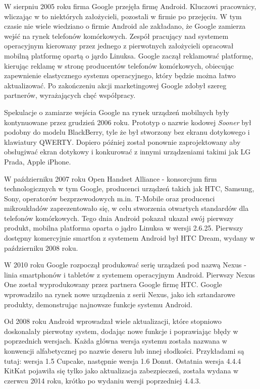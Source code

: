 W sierpniu 2005 roku firma Google przejęła firmę Android. Kluczowi pracownicy, wliczając w to niektórych założycieli, pozostali w firmie po przejęciu.\cite{android:9} W tym czasie nie wiele wiedziano o firmie Android ale zakładano, że Google zamierza wejść na rynek telefonów komórkowych.\cite{android:9} Zespół pracujący nad systemem operacyjnym kierowany przez jednego z pierwotnych założycieli opracował mobilną platformę opartą o jąrdo Linuksa. Google zaczął reklamować platformę, kierując reklamę w stronę producentów telefonów komórkowych, obiecując zapewnienie elastycznego systemu operacyjnego, który będzie można łatwo aktualizować. Po zakończeniu akcji marketingowej Google zdobył szereg partnerów, wyrażających chęć współpracy.\cite{android:11}\cite{android:12}\cite{android:13}

Spekulacje o zamiarze wejścia Google na rynek urządzeń mobilnych były kontynuowane przez grudzień 2006 roku.\cite{android:14} Prototyp o nazwie kodowej \emph{Sooner} był podobny do modelu BlackBerry, tyle że był stworzony bez ekranu dotykowego i klawiatury QWERTY. Dopiero później został ponownie zaprojektowany aby obsługiwać ekran dotykowy i konkurować z innymi urządzeniami takimi jak LG Prada, Apple iPhone.\cite{android:15}\cite{android:16}

W październiku 2007 roku Open Handset Alliance - konsorcjum firm technologicznych w tym Google, producenci urządzeń takich jak HTC, Samsung, Sony, operatorów bezprzewodowych m.in. T-Mobile oraz producenci mikroukładów zaprezentowało się, w celu stworzenia otwartych standardów dla telefonów komórkowych.\cite{android:17} Tego dnia Android pokazał ukazał swój pierwszy produkt, mobilna platforma oparta o jądro Linuksa w wersji 2.6.25.\cite{android:17}\cite{android:18} Pierwszy dostępny komercyjnie smartfon z systemem Android był HTC Dream, wydany w październiku 2008 roku.\cite{android:19}

W 2010 roku Google rozpoczął produkować serię urządzeń pod nazwą Nexus - linia smartphonów i tabletów z systemem operacyjnym Android. Pierwszy Nexus One został wyprodukowany przez partnera Google firmę HTC.\cite{android:20} Google wprowadziło na rynek nowe urządzenia z serii Nexus, jako ich sztandarowe produkty, demonstrując najnowsze funkcje systemu Android.

Od 2008 roku Android wprowadzał wiele aktualizacji, które stopniowo doskonalały pierwotny system, dodając nowe funkcje i poprawiając błędy w poprzednich wersjach. Każda główna wersja systemu została nazwana w konwencji alfabetycznej po nazwie deseru lub innej słodkości. Przykładami są tutaj: wersja 1.5 Cupcake, następnie wersja 1.6 Donut. Ostatnia wersja 4.4.4 KitKat pojawiła się tylko jako aktualizacja zabezpieczeń, została wydana w czerwcu 2014 roku, krótko po wydaniu wersji poprzedniej 4.4.3.\cite{android:21}\cite{android:22}\cite{android:23}

